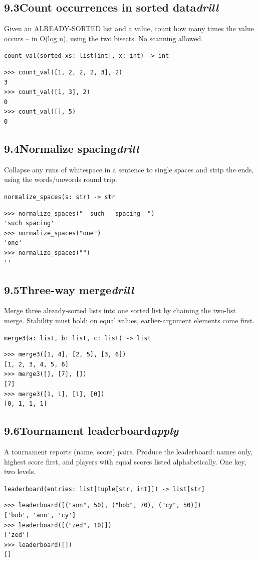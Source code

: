 \documentclass[10pt,letterpaper]{book}
\begin{document}
\subsection*{9.3\quad Count occurrences in sorted data\hfill\textnormal{\textit{drill}}}
Given an ALREADY-SORTED list and a value, count how many times the value occurs -- in O(log n), using the two bisects. No scanning allowed.

\noindent\texttt{count\_val(sorted\_xs: list[int], x: int) -> int}
\begin{lstlisting}[style=ex]
>>> count_val([1, 2, 2, 2, 3], 2)
3
>>> count_val([1, 3], 2)
0
>>> count_val([], 5)
0
\end{lstlisting}
\subsection*{9.4\quad Normalize spacing\hfill\textnormal{\textit{drill}}}
Collapse any runs of whitespace in a sentence to single spaces and strip the ends, using the words/unwords round trip.

\noindent\texttt{normalize\_spaces(s: str) -> str}
\begin{lstlisting}[style=ex]
>>> normalize_spaces("  such   spacing  ")
'such spacing'
>>> normalize_spaces("one")
'one'
>>> normalize_spaces("")
''
\end{lstlisting}
\subsection*{9.5\quad Three-way merge\hfill\textnormal{\textit{drill}}}
Merge three already-sorted lists into one sorted list by chaining the two-list merge. Stability must hold: on equal values, earlier-argument elements come first.

\noindent\texttt{merge3(a: list, b: list, c: list) -> list}
\begin{lstlisting}[style=ex]
>>> merge3([1, 4], [2, 5], [3, 6])
[1, 2, 3, 4, 5, 6]
>>> merge3([], [7], [])
[7]
>>> merge3([1, 1], [1], [0])
[0, 1, 1, 1]
\end{lstlisting}
\subsection*{9.6\quad Tournament leaderboard\hfill\textnormal{\textit{apply}}}
A tournament reports (name, score) pairs. Produce the leaderboard: names only, highest score first, and players with equal scores listed alphabetically. One key, two levels.

\noindent\texttt{leaderboard(entries: list[tuple[str, int]]) -> list[str]}
\begin{lstlisting}[style=ex]
>>> leaderboard([("ann", 50), ("bob", 70), ("cy", 50)])
['bob', 'ann', 'cy']
>>> leaderboard([("zed", 10)])
['zed']
>>> leaderboard([])
[]
\end{lstlisting}
\end{document}
